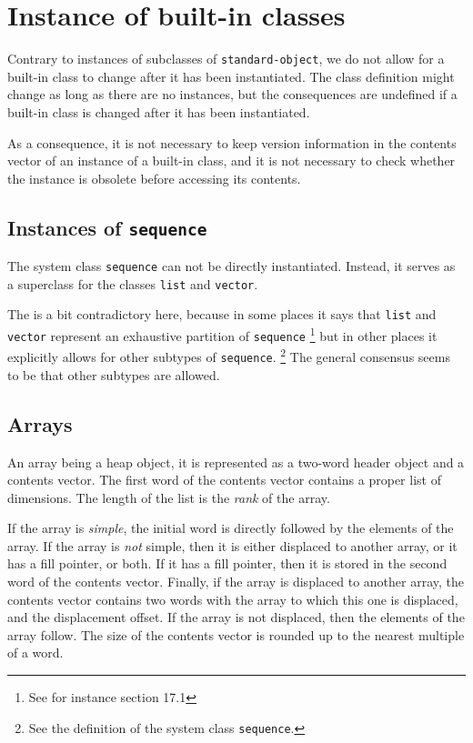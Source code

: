 \section{Instance of built-in classes}

Contrary to instances of subclasses of \texttt{standard-object}, we do
not allow for a built-in class to change after it has been
instantiated.  The class definition might change as long as there are
no instances, but the consequences are undefined if a built-in class
is changed after it has been instantiated.

As a consequence, it is not necessary to keep version information in
the contents vector of an instance of a built-in class, and it is not
necessary to check whether the instance is obsolete before accessing
its contents.  

\subsection{Instances of \texttt{sequence}}

The system class \texttt{sequence} can not be directly instantiated.
Instead, it serves as a superclass for the classes \texttt{list} and
\texttt{vector}.  

The \hs{} is a bit contradictory here, because
in some places it says that \texttt{list} and \texttt{vector}
represent an exhaustive partition of \texttt{sequence}%
\footnote{See for instance section 17.1}
but in other places it explicitly allows for other subtypes of
\texttt{sequence}.%
\footnote{See the definition of the system class \texttt{sequence}.}
The general consensus seems to be that other subtypes are allowed. 


\subsection{Arrays}
\label{sec-data-representation-arrays}

An array being a heap object, it is represented as a two-word header
object and a contents vector.  The first word of the contents vector
contains a proper list of dimensions.  The length of the list is the
\emph{rank} of the array.

If the array is \emph{simple}, the initial word is directly followed
by the elements of the array.  If the array is \emph{not} simple, then
it is either displaced to another array, or it has a fill pointer, or
both.  If it has a fill pointer, then it is stored in the second word
of the contents vector.  Finally, if the array is displaced to another
array, the contents vector contains two words with the array to which
this one is displaced, and the displacement offset.  If the array is
not displaced, then the elements of the array follow.  The size of the
contents vector is rounded up to the nearest multiple of a word. 


